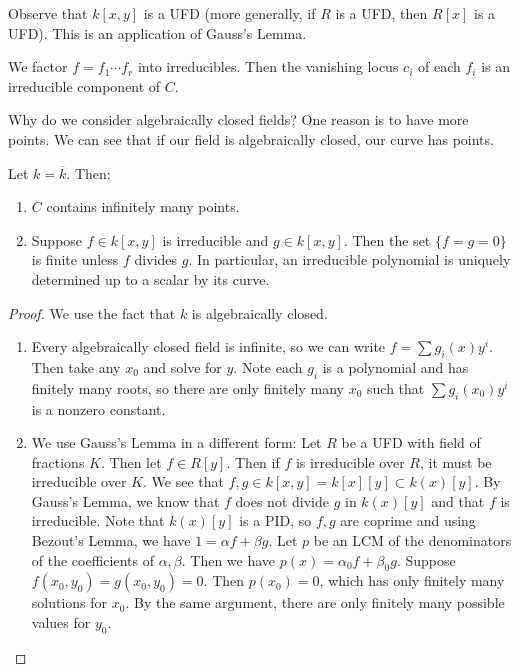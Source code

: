 \documentclass[twoside, 10pt]{article}
\begin{document}
    \begin{rmk}
        Observe that $k[x,y]$ is a UFD (more generally, if $R$ is a UFD, then $R[x]$ is a UFD). This is an application of Gauss's Lemma.
    \end{rmk}

    \begin{defn}
        We factor $f = f_1 \cdots f_r$ into irreducibles. Then the vanishing locus $c_i$ of each $f_i$ is an irreducible component of $C$.
    \end{defn}
    
    Why do we consider algebraically closed fields? One reason is to have more points. We can see that if our field is algebraically closed, our curve has points.

    \begin{lem}
        Let $k= \overline{k}$. Then:

        \begin{enumerate}
            \item $C$ contains infinitely many points.
            \item Suppose $f \in k[x,y]$ is irreducible and $g \in k[x,y]$. Then the set $\{f=g=0\}$ is finite unless $f$ divides $g$. In particular, an irreducible polynomial is uniquely determined up to a scalar by its curve.
        \end{enumerate}

        \begin{proof}
            We use the fact that $k$ is algebraically closed.
            \begin{enumerate}
                \item Every algebraically closed field is infinite, so we can write $f = \sum g_i(x)y^i$. Then take any $x_0$ and solve for $y$. Note each $g_i$ is a polynomial and has finitely many roots, so there are only finitely many $x_0$ such that $\sum g_i(x_0)y^i$ is a nonzero constant.
                \item We use Gauss's Lemma in a different form: Let $R$ be a UFD with field of fractions $K$. Then let $f \in R[y]$. Then if $f$ is irreducible over $R$, it must be irreducible over $K$. We see that $f,g \in k[x,y] = k[x][y] \subset k(x)[y]$. By Gauss's Lemma, we know that $f$ does not divide $g$ in $k(x)[y]$ and that $f$ is irreducible. Note that $k(x)[y]$ is a PID, so $f,g$ are coprime and using Bezout's Lemma, we have $1 = \alpha f + \beta g$. Let $p$ be an LCM of the denominators of the coefficients of $\alpha,\beta$. Then we have $p(x) = \alpha_0 f + \beta_0 g$. Suppose $f(x_0,y_0) = g(x_0,y_0) = 0$. Then $p(x_0) = 0$, which has only finitely many solutions for $x_0$. By the same argument, there are only finitely many possible values for $y_0$.
            \end{enumerate}
        \end{proof}
    \end{lem}
\end{document}
